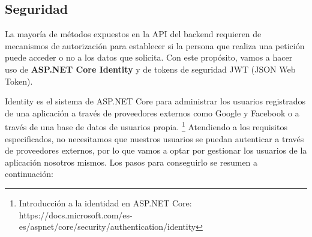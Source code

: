 \documentclass[11pt,spanish,listoffigures]{tfgetsinf}
\begin{document}
\subsection{Seguridad}

La mayoría de métodos expuestos en la API del backend requieren de mecanismos de autorización para establecer si la persona que realiza una petición puede acceder o no a los datos que solicita. Con este propósito, vamos a hacer uso de \textbf{ASP.NET Core Identity} y de tokens de seguridad JWT (JSON Web Token). 

Identity es el sistema de ASP.NET Core para administrar los usuarios registrados de una aplicación a través de proveedores externos como Google y Facebook o a través de una base de datos de usuarios propia. \footnote{ Introducción a la identidad en ASP.NET Core: https://docs.microsoft.com/es-es/aspnet/core/security/authentication/identity} Atendiendo a los requisitos especificados, no necesitamos que nuestros usuarios se puedan autenticar a través de proveedores externos, por lo que vamos a optar por gestionar los usuarios de la aplicación nosotros mismos. Los pasos para conseguirlo se resumen a continuación:
\end{document}
